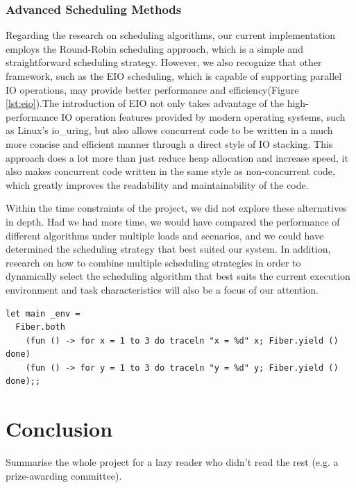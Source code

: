 \documentclass{l4proj}
\begin{document}
\subsection{Advanced Scheduling Methods}

Regarding the research on scheduling algorithms, our current implementation employs the Round-Robin scheduling approach, which is a simple and straightforward scheduling strategy. However, we also recognize that other framework, such as the EIO scheduling, which is capable of supporting parallel IO operations, may provide better performance and efficiency(Figure \ref{lst:eio}).The introduction of EIO not only takes advantage of the high-performance IO operation features provided by modern operating systems, such as Linux's io\_uring, but also allows concurrent code to be written in a much more concise and efficient manner through a direct style of IO stacking. This approach does a lot more than just reduce heap allocation and increase speed, it also makes concurrent code written in the same style as non-concurrent code, which greatly improves the readability and maintainability of the code.

Within the time constraints of the project, we did not explore these alternatives in depth. Had we had more time, we would have compared the performance of different algorithms under multiple loads and scenarios, and we could have determined the scheduling strategy that best suited our system. In addition, research on how to combine multiple scheduling strategies in order to dynamically select the scheduling algorithm that best suits the current execution environment and task characteristics will also be a focus of our attention.

\noindent\begin{minipage}{\linewidth}
\lstset{style=ocamlstyle}
\begin{lstlisting}[caption={Example of running two threads of execution concurrently using Eio.Fiber \colorbox{yellow}{referenceHere}}, label={lst:eio}]
let main _env =
  Fiber.both
    (fun () -> for x = 1 to 3 do traceln "x = %d" x; Fiber.yield () done)
    (fun () -> for y = 1 to 3 do traceln "y = %d" y; Fiber.yield () done);;
\end{lstlisting}
\end{minipage}


\chapter{Conclusion}    
Summarise the whole project for a lazy reader who didn't read the rest (e.g. a prize-awarding committee).
\end{document}
